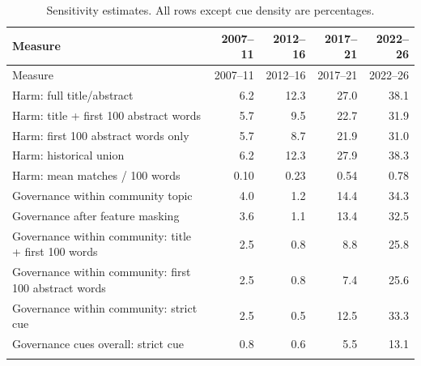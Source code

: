 \begingroup
\small
\begin{longtable}{@{}p{}rrrr@{}}
\caption{Sensitivity estimates. All rows except cue density are percentages.}\label{tab:sensitivity}\\
\toprule
Measure & 2007--11 & 2012--16 & 2017--21 & 2022--26 \\
\midrule
\endfirsthead
\toprule
Measure & 2007--11 & 2012--16 & 2017--21 & 2022--26 \\
\midrule
\endhead
\bottomrule
\endfoot
Harm: full title/abstract & 6.2 & 12.3 & 27.0 & 38.1 \\ \addlinespace
Harm: title + first 100 abstract words & 5.7 & 9.5 & 22.7 & 31.9 \\ \addlinespace
Harm: first 100 abstract words only & 5.7 & 8.7 & 21.9 & 31.0 \\ \addlinespace
Harm: historical union & 6.2 & 12.3 & 27.9 & 38.3 \\ \addlinespace
Harm: mean matches / 100 words & 0.10 & 0.23 & 0.54 & 0.78 \\ \addlinespace
Governance within community topic & 4.0 & 1.2 & 14.4 & 34.3 \\ \addlinespace
Governance after feature masking & 3.6 & 1.1 & 13.4 & 32.5 \\ \addlinespace
Governance within community: title + first 100 words & 2.5 & 0.8 & 8.8 & 25.8 \\ \addlinespace
Governance within community: first 100 abstract words & 2.5 & 0.8 & 7.4 & 25.6 \\ \addlinespace
Governance within community: strict cue & 2.5 & 0.5 & 12.5 & 33.3 \\ \addlinespace
Governance cues overall: strict cue & 0.8 & 0.6 & 5.5 & 13.1 \\ \addlinespace
\end{longtable}
\endgroup
